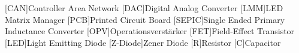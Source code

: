 
\begin{acronym}[ACRONYM]
[CAN]{Controller Area Network}
[DAC]{Digital Analog Converter}
[LMM]{LED Matrix Manager}
[PCB]{Printed Circuit Board}
[SEPIC]{Single Ended Primary Inductance Converter}
[OPV]{Operationsverstärker}
[FET]{Field-Effect Transistor}
[LED]{Light Emitting Diode}
[Z-Diode]{Zener Diode}
[R]{Resistor}
[C]{Capacitor}
\end{acronym}\newpage

